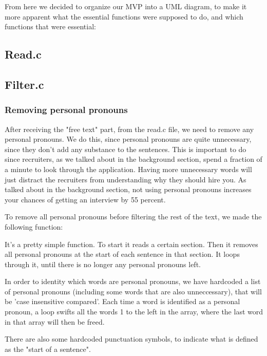 From here we decided to organize our MVP into a UML diagram, to make it more apparent
what the essential functions were supposed to do, and which functions that were essential:

\subsection{Read.c}
\subsection{Filter.c}


\subsubsection{Removing personal pronouns}
After receiving the "free text" part, from the read.c file, we need to remove any personal pronouns.
We do this, since personal pronouns are quite unnecessary, since they don't add any substance to the sentences.
This is important to do since recruiters, as we talked about in the background section, spend a fraction of a minute
to look through the application. 
Having more unnecessary words will just distract the recruiters from understanding why they should hire you.
As talked about in the background section, not using personal pronouns increases your
chances of getting an interview by 55 percent.

To remove all personal pronouns before filtering the rest of the text, we made the following function:

It's a pretty simple function. To start it reads a certain section. 
Then it removes all personal pronouns at the start of each sentence in that section.
It loops through it, until there is no longer any personal pronouns left.

In order to identity which words are personal pronouns, we have hardcoded a list of personal pronouns 
(including some words that are also unneccessary), that will be 'case insensitive compared'.
Each time a word is identified as a personal pronoun, a loop swifts all the words 1 to the left in the array, 
where the last word in that array will then be freed.

There are also some hardcoded punctuation symbols, to indicate what is defined as the "start of a sentence". 

